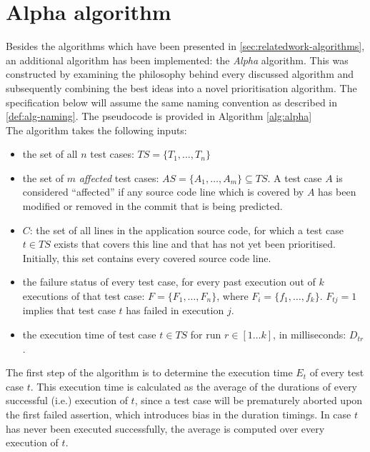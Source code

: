 
\section{Alpha algorithm}
Besides the algorithms which have been presented in \autoref{sec:relatedwork-algorithms}, an additional algorithm has been implemented: the \emph{Alpha} algorithm. This was constructed by examining the philosophy behind every discussed algorithm and subsequently combining the best ideas into a novel prioritisation algorithm. The specification below will assume the same naming convention as described in \autoref{def:alg-naming}. The pseudocode is provided in Algorithm \ref{alg:alpha}\\

\noindent The algorithm takes the following inputs:
\begin{itemize}
	\item the set of all $n$ test cases: $TS = \{T_1, \dots, T_n\}$
	
	\item the set of $m$ \emph{affected} test cases: $AS = \{A_1, \dots, A_m\} \subseteq TS$. A test case $A$ is considered ``affected'' if any source code line which is covered by $A$ has been modified or removed in the commit that is being predicted.
	
	\item $C$: the set of all lines in the application source code, for which a test case $t \in TS$ exists that covers this line and that has not yet been prioritised. Initially, this set contains every covered source code line.
	
	\item the failure status of every test case, for every past execution out of $k$ executions of that test case: $F = \{F_1, \dots, F_n\}$, where $F_i = \{f_1, \dots, f_k\}$. $F_{tj} = 1$ implies that test case $t$ has failed in execution $j$.
	
	\item the execution time of test case $t \in TS$ for run $r \in [1 \dots k]$, in milliseconds: $D_{tr}$.
\end{itemize}

\noindent The first step of the algorithm is to determine the execution time $E_t$ of every test case $t$. This execution time is calculated as the average of the durations of every successful (i.e.) execution of $t$, since a test case will be prematurely aborted upon the first failed assertion, which introduces bias in the duration timings. In case $t$ has never been executed successfully, the average is computed over every execution of $t$.

